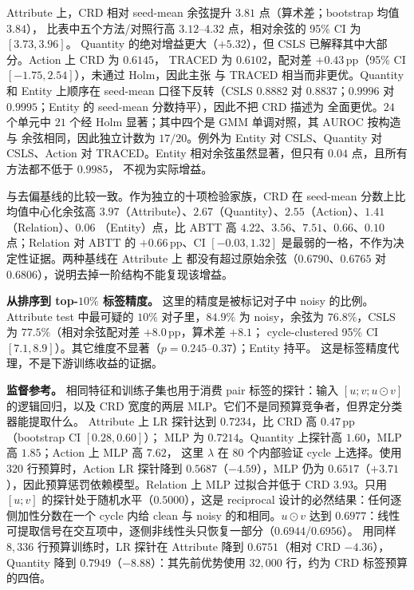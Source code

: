 \documentclass[10pt,twocolumn,a4paper]{ctexart}
\begin{document}
Attribute 上，CRD 相对 seed-mean 余弦提升 $3.81$ 点（算术差；bootstrap 均值 $3.84$），
比表中五个方法/对照行高 $3.12$--$4.32$ 点，相对余弦的 95\% CI 为 $[3.73,3.96]$。
Quantity 的绝对增益更大（$+5.32$），但 CSLS 已解释其中大部分。Action 上 CRD 为 $0.6145$，
TRACED 为 $0.6102$，配对差 $+0.43$\,pp（95\% CI $[-1.75,2.54]$），未通过 Holm，因此主张
与 TRACED 相当而非更优。Quantity 和 Entity 上顺序在 seed-mean 口径下反转（CSLS $0.8882$
对 $0.8837$；$0.9996$ 对 $0.9995$；Entity 的 seed-mean 分数持平），因此不把 CRD 描述为
全面更优。$24$ 个单元中 $21$ 个经 Holm 显著；其中四个是 GMM 单调对照，其 AUROC 按构造与
余弦相同，因此独立计数为 $17/20$。例外为 Entity 对 CSLS、Quantity 对 CSLS、Action 对
TRACED。Entity 相对余弦虽然显著，但只有 $0.04$ 点，且所有方法都不低于 $0.9985$，
不视为实际增益。

与去偏基线的比较一致。作为独立的十项检验家族，CRD 在 seed-mean 分数上比均值中心化余弦高
$3.97$（Attribute）、$2.67$（Quantity）、$2.55$（Action）、$1.41$（Relation）、$0.06$
（Entity）点，比 ABTT 高 $4.22$、$3.56$、$7.51$、$0.66$、$0.10$ 点；Relation 对 ABTT 的
$+0.66$\,pp、CI $[-0.03,1.32]$ 是最弱的一格，不作为决定性证据。两种基线在 Attribute 上
都没有超过原始余弦（$0.6790$、$0.6765$ 对 $0.6806$），说明去掉一阶结构不能复现该增益。

\textbf{从排序到 top-$10\%$ 标签精度。} 这里的精度是被标记对子中 noisy 的比例。Attribute test 中最可疑的 $10\%$ 对子里，$84.9\%$ 为
noisy，余弦为 $76.8\%$，CSLS 为 $77.5\%$（相对余弦配对差 $+8.0$\,pp，算术差 $+8.1$；
cycle-clustered 95\% CI $[7.1,8.9]$）。其它维度不显著（$p=0.245$--$0.37$）；Entity 持平。
这是标签精度代理，不是下游训练收益的证据。

\textbf{监督参考。} 相同特征和训练子集也用于消费 pair 标签的探针：输入 $[u;v;u\odot v]$
的逻辑回归，以及 CRD 宽度的两层 MLP。它们不是同预算竞争者，但界定分类器能提取什么。
Attribute 上 LR 探针达到 $0.7234$，比 CRD 高 $0.47$\,pp（bootstrap CI $[0.28,0.60]$）；
MLP 为 $0.7214$。Quantity 上探针高 $1.60$，MLP 高 $1.85$；Action 上 MLP 高 $7.62$，
这里 $\lambda$ 在 $80$ 个内部验证 cycle 上选择。使用 $320$ 行预算时，Action LR 探针降到
$0.5687$（$-4.59$），MLP 仍为 $0.6517$（$+3.71$），因此预算惩罚依赖模型。Relation 上 MLP
过拟合并低于 CRD $3.93$。只用 $[u;v]$ 的探针处于随机水平（$0.5000$），这是 reciprocal
设计的必然结果：任何逐侧加性分数在一个 cycle 内给 clean 与 noisy 的和相同。$u\odot v$ 达到
$0.6977$：线性可提取信号在交互项中，逐侧非线性头只恢复一部分（$0.6944$/$0.6956$）。
用同样 $8{,}336$ 行预算训练时，LR 探针在 Attribute 降到 $0.6751$（相对 CRD $-4.36$），
Quantity 降到 $0.7949$（$-8.88$）：其先前优势使用 $32{,}000$ 行，约为 CRD 标签预算的四倍。
\end{document}
